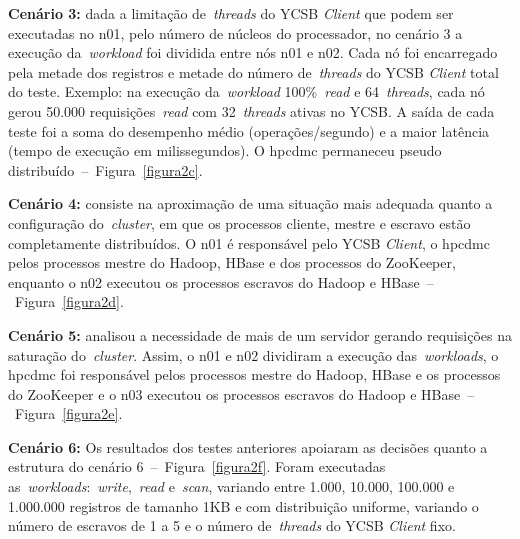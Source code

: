 \documentclass[12pt]{article}
\begin{document}
\textbf{Cenário 3:} dada a limitação de~\emph{threads} do YCSB \emph{Client} que podem ser executadas no n01, pelo número de núcleos do processador, no cenário 3 a execução da~\emph{workload} foi dividida entre nós n01 e n02. 
Cada nó foi encarregado pela metade dos registros e metade do número de~\emph{threads} do YCSB \emph{Client} total do teste. 
Exemplo: na execução da~\emph{workload} 100\%~\emph{read} e 64~\emph{threads}, cada nó gerou 50.000 requisições~\emph{read} com 32~\emph{threads} ativas no YCSB. 
A saída de cada teste foi a soma do desempenho médio (operações/segundo) e a maior latência (tempo de execução em milissegundos). 
O hpcdmc permaneceu pseudo distribuído~--~Figura~\ref{figura2c}.

\textbf{Cenário 4:} consiste na aproximação de uma situação mais adequada quanto a configuração do~\emph{cluster}, em que os processos cliente, mestre e escravo estão completamente distribuídos. 
O n01 é responsável pelo YCSB \textit{Client}, o hpcdmc pelos processos mestre do Hadoop, HBase e dos processos do ZooKeeper, enquanto o n02 executou os processos escravos do Hadoop e HBase~--~Figura~\ref{figura2d}.

\textbf{Cenário 5:} analisou a necessidade de mais de um servidor gerando requisições na saturação do~\emph{cluster}. 
Assim, o n01 e n02 dividiram a execução das~\emph{workloads}, o hpcdmc foi responsável pelos processos mestre do Hadoop, HBase e os processos do ZooKeeper e o n03 executou os processos escravos do Hadoop e HBase~--~Figura~\ref{figura2e}.

\textbf{Cenário 6:} Os resultados dos testes anteriores apoiaram as decisões quanto a estrutura do cenário 6~--~Figura~\ref{figura2f}. Foram executadas as~\emph{workloads}:~\emph{write},~\emph{read} e~\emph{scan}, variando entre 1.000, 10.000, 100.000 e 1.000.000 registros de tamanho 1KB e com distribuição uniforme, variando o número de escravos de 1 a 5 e o número de~\emph{threads} do YCSB \textit{Client} fixo.
\end{document}
